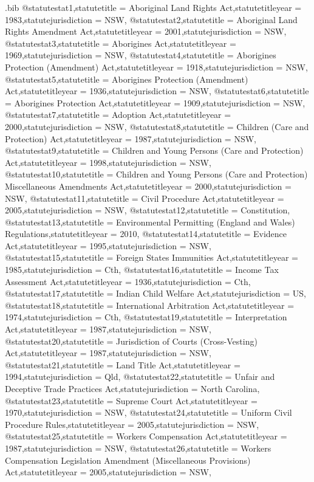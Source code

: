 \begin{filecontents*}{\jobname.bib}
@statute{stat1,statutetitle = {Aboriginal Land Rights Act},statutetitleyear = {1983},statutejurisdiction = {NSW},}
@statute{stat2,statutetitle = {Aboriginal Land Rights Amendment Act},statutetitleyear = {2001},statutejurisdiction = {NSW},}
@statute{stat3,statutetitle = {Aborigines Act},statutetitleyear = {1969},statutejurisdiction = {NSW},}
@statute{stat4,statutetitle = {Aborigines Protection (Amendment) Act},statutetitleyear = {1918},statutejurisdiction = {NSW},}
@statute{stat5,statutetitle = {Aborigines Protection (Amendment) Act},statutetitleyear = {1936},statutejurisdiction = {NSW},}
@statute{stat6,statutetitle = {Aborigines Protection Act},statutetitleyear = {1909},statutejurisdiction = {NSW},}
@statute{stat7,statutetitle = {Adoption Act},statutetitleyear = {2000},statutejurisdiction = {NSW},}
@statute{stat8,statutetitle = {Children (Care and Protection) Act},statutetitleyear = {1987},statutejurisdiction = {NSW},}
@statute{stat9,statutetitle = {Children and Young Persons (Care and Protection) Act},statutetitleyear = {1998},statutejurisdiction = {NSW},}
@statute{stat10,statutetitle = {Children and Young Persons (Care and Protection) Miscellaneous Amendments Act},statutetitleyear = {2000},statutejurisdiction = {NSW},}
@statute{stat11,statutetitle = {Civil Procedure Act},statutetitleyear = {2005},statutejurisdiction = {NSW},}
@statute{stat12,statutetitle = {Constitution},}
@statute{stat13,statutetitle = {Environmental Permitting (England and Wales) Regulations},statutetitleyear = {2010},}
@statute{stat14,statutetitle = {Evidence Act},statutetitleyear = {1995},statutejurisdiction = {NSW},}
@statute{stat15,statutetitle = {Foreign States Immunities Act},statutetitleyear = {1985},statutejurisdiction = {Cth},}
@statute{stat16,statutetitle = {Income Tax Assessment Act},statutetitleyear = {1936},statutejurisdiction = {Cth},}
@statute{stat17,statutetitle = {Indian Child Welfare Act},statutejurisdiction = {US},}
@statute{stat18,statutetitle = {International Arbitration Act},statutetitleyear = {1974},statutejurisdiction = {Cth},}
@statute{stat19,statutetitle = {Interpretation Act},statutetitleyear = {1987},statutejurisdiction = {NSW},}
@statute{stat20,statutetitle = {Jurisdiction of Courts (Cross-Vesting) Act},statutetitleyear = {1987},statutejurisdiction = {NSW},}
@statute{stat21,statutetitle = {Land Title Act},statutetitleyear = {1994},statutejurisdiction = {Qld},}
@statute{stat22,statutetitle = {Unfair and Deceptive Trade Practices Act},statutejurisdiction = {North Carolina},}
@statute{stat23,statutetitle = {Supreme Court Act},statutetitleyear = {1970},statutejurisdiction = {NSW},}
@statute{stat24,statutetitle = {Uniform Civil Procedure Rules},statutetitleyear = {2005},statutejurisdiction = {NSW},}
@statute{stat25,statutetitle = {Workers Compensation Act},statutetitleyear = {1987},statutejurisdiction = {NSW},}
@statute{stat26,statutetitle = {Workers Compensation Legislation Amendment (Miscellaneous Provisions) Act},statutetitleyear = {2005},statutejurisdiction = {NSW},}


\end{filecontents*}


